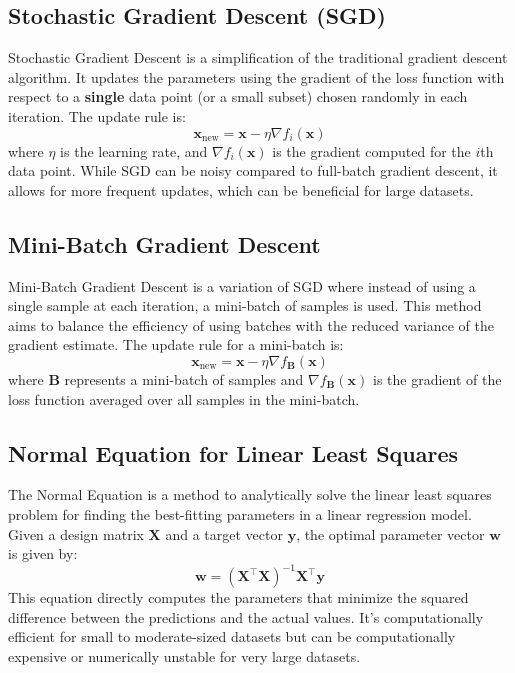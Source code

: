 \documentclass[8pt, a4paper, landscape, includeheadfoot]{extarticle}
\begin{document}
\begin{multicols*}{4}
	\subsection{Stochastic Gradient Descent (SGD)}
	Stochastic Gradient Descent is a simplification of the traditional gradient descent algorithm. It updates the parameters using the gradient of the loss function with respect to a \textbf{single} data point (or a small subset) chosen randomly in each iteration. The update rule is:
	\[
		\mathbf{x}_{\text{new}} = \mathbf{x} - \eta \nabla f_i(\mathbf{x})
	\]
	where \(\eta\) is the learning rate, and \(\nabla f_i(\mathbf{x})\) is the gradient computed for the \(i\)th data point. While SGD can be noisy compared to full-batch gradient descent, it allows for more frequent updates, which can be beneficial for large datasets.

	\subsection{Mini-Batch Gradient Descent}
	Mini-Batch Gradient Descent is a variation of SGD where instead of using a single sample at each iteration, a mini-batch of samples is used. This method aims to balance the efficiency of using batches with the reduced variance of the gradient estimate. The update rule for a mini-batch is:
	\[
		\mathbf{x}_{\text{new}} = \mathbf{x} - \eta \nabla f_{\mathbf{B}}(\mathbf{x})
	\]
	where \(\mathbf{B}\) represents a mini-batch of samples and \(\nabla f_{\mathbf{B}}(\mathbf{x})\) is the gradient of the loss function averaged over all samples in the mini-batch.

	\subsection{Normal Equation for Linear Least Squares}
	The Normal Equation is a method to analytically solve the linear least squares problem for finding the best-fitting parameters in a linear regression model. Given a design matrix \(\mathbf{X}\) and a target vector \(\mathbf{y}\), the optimal parameter vector \(\mathbf{w}\) is given by:
	\[
		\mathbf{w} = \left(\mathbf{X}^\top \mathbf{X}\right)^{-1} \mathbf{X}^\top \mathbf{y}
	\]
	This equation directly computes the parameters that minimize the squared difference between the predictions and the actual values. It's computationally efficient for small to moderate-sized datasets but can be computationally expensive or numerically unstable for very large datasets.


\end{multicols*}
\end{document}
